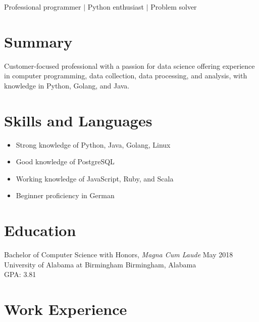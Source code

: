 \documentclass[10pt]{setzerresume}
\begin{document}

  \centerline { Professional programmer $|$ Python enthusiast $|$ Problem solver }

  \section{Summary}
  Customer-focused professional with a passion for data science offering experience in computer programming, data collection, data processing, and analysis, with knowledge in Python, Golang, and Java.

  \section{Skills and Languages}

  \begin{itemize}[nosep]
    \item Strong knowledge of Python, Java, Golang, Linux
    \item Good knowledge of PostgreSQL
    \item Working knowledge of JavaScript, Ruby, and Scala
    \item Beginner proficiency in German
  \end{itemize}

  \section{Education}
  Bachelor of Computer Science with Honors, \textit{Magna Cum Laude} \hfill May 2018 \\
  University of Alabama at Birmingham \hfill Birmingham, Alabama \\
  GPA\@: 3.81


  \section{Work Experience}

\end{document}
